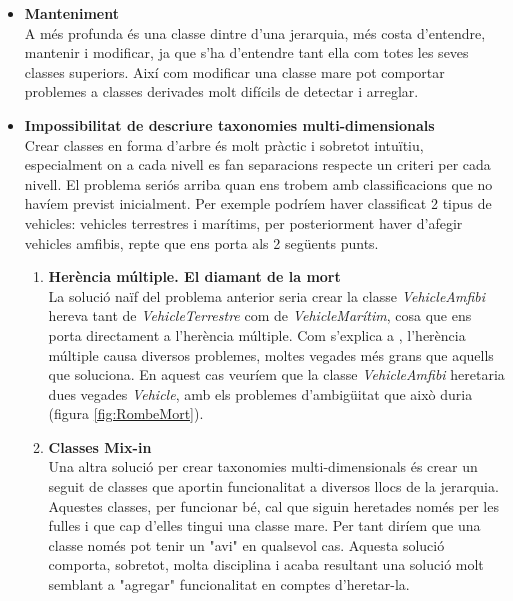 \begin{itemize}
  \item {\bf Manteniment} \hfill \\
    A més profunda és una classe dintre d'una jerarquia, més costa d'entendre, mantenir i modificar, ja que s'ha d'entendre tant ella com totes les seves classes superiors. Així com modificar una classe mare pot comportar problemes  a classes derivades molt difícils de detectar i arreglar.
    
  \item {\bf Impossibilitat de descriure taxonomies multi-dimensionals} \hfill \\
    Crear classes en forma d'arbre és molt pràctic i sobretot intuïtiu, especialment on a cada nivell es fan separacions respecte un criteri per cada nivell. El problema seriós arriba quan ens trobem amb classificacions que no havíem previst inicialment. Per exemple podríem haver classificat 2 tipus de vehicles: vehicles terrestres i marítims, per posteriorment haver d'afegir vehicles amfibis, repte que ens porta als 2 següents punts.
    \begin{enumerate}
      \item {\bf Herència múltiple. El diamant de la mort} \hfill \\
        La solució naïf del problema anterior seria crear la classe {\em VehicleAmfibi} hereva tant de {\em VehicleTerrestre} com de {\em VehicleMarítim}, cosa que ens porta directament a l'herència múltiple. Com s'explica a \cite[p.~2]{Martin97}, l'herència múltiple causa diversos problemes, moltes vegades més grans que aquells que soluciona. En aquest cas veuríem que la classe {\em VehicleAmfibi} heretaria dues vegades {\em Vehicle}, amb els problemes d'ambigüitat que això duria (figura \ref{fig:RombeMort}).
        
      \item {\bf Classes Mix-in} \hfill \\
        Una altra solució per crear taxonomies multi-dimensionals és crear un seguit de classes que aportin funcionalitat a diversos llocs de la jerarquia. Aquestes classes, per funcionar bé, cal que siguin heretades només per les fulles i que cap d'elles tingui una classe mare. Per tant diríem que una classe només pot tenir un "avi" en qualsevol cas. Aquesta solució comporta, sobretot, molta disciplina i acaba resultant una solució molt semblant a "agregar" funcionalitat en comptes d'heretar-la.
        

\end{enumerate}
\end{itemize}
